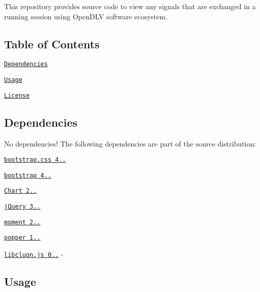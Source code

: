 This repository provides source code to view any signals that are exchanged in a running session using Open\+D\+LV software ecosystem.

\href{https://opensource.org/licenses/BSD-3-Clause}{\tt }

\subsection*{Table of Contents}


\begin{DoxyItemize}
\item \href{#dependencies}{\tt Dependencies}
\item \href{#usage}{\tt Usage}
\item \href{#license}{\tt License}
\end{DoxyItemize}

\subsection*{Dependencies}

No dependencies! The following dependencies are part of the source distribution\+:


\begin{DoxyItemize}
\item \href{https://maxcdn.bootstrapcdn.com/bootstrap/4.0.0/css/bootstrap.min.css}{\tt bootstrap.\+css 4..}
\item \href{https://maxcdn.bootstrapcdn.com/bootstrap/4.0.0/js/bootstrap.min.js}{\tt bootstrap 4..}
\item \href{https://cdnjs.cloudflare.com/ajax/libs/Chart.js/2.7.1/Chart.js}{\tt Chart 2..}
\item \href{https://code.jquery.com/jquery-3.2.1.slim.min.js}{\tt j\+Query 3..}
\item \href{moment-with-locales.min.js}{\tt moment 2..}
\item \href{https://cdnjs.cloudflare.com/ajax/libs/popper.js/1.12.9/umd/popper.min.js}{\tt popper 1..}
\item \href{https://github.com/chrberger/libcluon}{\tt libcluon.\+js 0..} -\/ \href{https://opensource.org/licenses/BSD-3-Clause}{\tt }
\end{DoxyItemize}

\subsection*{Usage}


